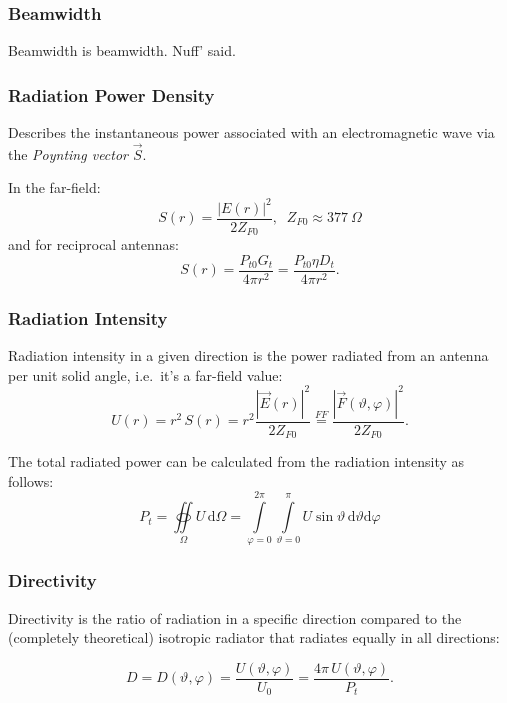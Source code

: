 \subsubsection{Beamwidth}
Beamwidth is beamwidth. Nuff' said.

\subsubsection{Radiation Power Density}
Describes the instantaneous power associated with an electromagnetic wave via the \textit{Poynting vector} $\vec{S}$.

\noindent In the far-field:
\begin{equation*}
    S(r) = \dfrac{|E(r)|^2}{2 Z_{F0}},\;\; Z_{F0} \approx \SI{377}{\Omega}
\end{equation*}
and for reciprocal antennas:
\begin{equation*}
    S(r) = \dfrac{P_{t0}G_t}{4\pi r^2} = \dfrac{P_{t0}\eta D_t}{4\pi r^2}.
\end{equation*}

\subsubsection{Radiation Intensity}
Radiation intensity in a given direction is the power radiated from an antenna per unit solid angle, i.e.\ it's a far-field value:
\begin{equation*}
  U(r) = r^{2}\,S(r) = r^{2} \dfrac{{|\vec{E}(r)|}^{2}}{2 Z_{F0}} \overset{FF}{=} \dfrac{{|\vec{F}(\vartheta, \varphi)|}^{2}}{2 Z_{F0}}.
\end{equation*}

The total radiated power can be calculated from the radiation intensity as follows:
\begin{equation*}
  P_{t} = \oiint\limits_{\Omega} U \,\mathrm{d}\Omega = \int\limits_{\varphi=0}^{2\pi} \int\limits_{\vartheta=0}^{\pi} U \sin\vartheta \, \mathrm{d}\vartheta\mathrm{d}\varphi
\end{equation*}

\subsubsection{Directivity}
Directivity is the ratio of radiation in a specific direction compared to the (completely theoretical) isotropic radiator that radiates equally in all directions:

\begin{equation*}
 D = D(\vartheta, \varphi) = \dfrac{U(\vartheta, \varphi)}{U_{0}} = \dfrac{4\pi\,U(\vartheta, \varphi)}{P_{t}}.
\end{equation*}

